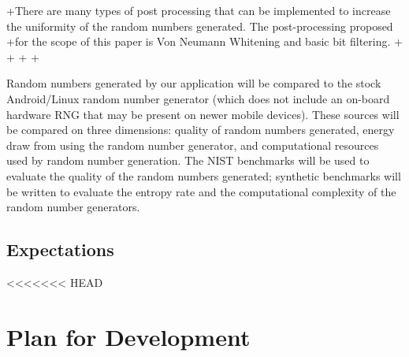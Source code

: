 \documentclass[conference]{IEEEtran}
\begin{document}

+There are many types of post processing that can be implemented to increase the uniformity of the random numbers generated. The post-processing proposed
+for the scope of this paper is Von Neumann Whitening \cite{vn_whitening} and basic bit filtering. 
+
+%
+%
+%
 
 Random numbers generated by our application will be compared to the stock Android/Linux random number generator (which does not include an on-board hardware
RNG that may be present on newer mobile devices).  These sources will be compared on three dimensions: quality of random numbers generated,
 energy draw from using the random number generator, and computational resources used by random number generation.  The NIST 
 \cite{nist} benchmarks will be used to evaluate the quality of the random numbers generated; synthetic benchmarks will be written to evaluate the
 entropy rate and the computational complexity of the random number generators.



\subsection{Expectations}


<<<<<<< HEAD
\section{Plan for Development}

\end{document}
